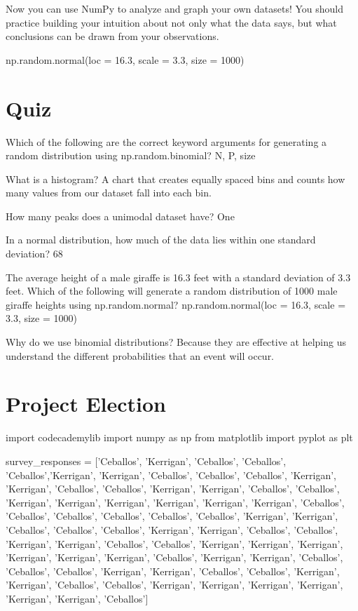 \documentclass{journal}
\begin{document}
Now you can use NumPy to analyze and graph your own datasets! You should practice building your intuition about not only what the data says, but what conclusions can be drawn from your observations.

np.random.normal(loc = 16.3, scale = 3.3, size = 1000)


\section{Quiz}
Which of the following are the correct keyword arguments for generating a random distribution using np.random.binomial?
N, P, size

What is a histogram?
A chart that creates equally spaced bins and counts how many values from our dataset fall into each bin.

How many peaks does a unimodal dataset have?
One

In a normal distribution, how much of the data lies within one standard deviation?
68%


The average height of a male giraffe is 16.3 feet with a standard deviation of 3.3 feet. Which of the following will generate a random distribution of 1000 male giraffe heights using np.random.normal?
np.random.normal(loc = 16.3, scale = 3.3, size = 1000)


Why do we use binomial distributions?
Because they are effective at helping us understand the different probabilities that an event will occur.


\section{Project Election}
import codecademylib
import numpy as np
from matplotlib import pyplot as plt

survey_responses = ['Ceballos', 'Kerrigan', 'Ceballos', 'Ceballos', 'Ceballos','Kerrigan', 'Kerrigan', 'Ceballos', 'Ceballos', 'Ceballos', 
'Kerrigan', 'Kerrigan', 'Ceballos', 'Ceballos', 'Kerrigan', 'Kerrigan', 'Ceballos', 'Ceballos', 'Kerrigan', 'Kerrigan', 'Kerrigan', 'Kerrigan', 'Kerrigan', 'Kerrigan', 'Ceballos', 'Ceballos', 'Ceballos', 'Ceballos', 'Ceballos', 'Ceballos',
'Kerrigan', 'Kerrigan', 'Ceballos', 'Ceballos', 'Ceballos', 'Kerrigan', 'Kerrigan', 'Ceballos', 'Ceballos', 'Kerrigan', 'Kerrigan', 'Ceballos', 'Ceballos', 'Kerrigan', 'Kerrigan', 'Kerrigan', 'Kerrigan', 'Kerrigan', 'Kerrigan', 'Ceballos',
'Kerrigan', 'Kerrigan', 'Ceballos', 'Ceballos', 'Ceballos', 'Kerrigan', 'Kerrigan', 'Ceballos', 'Ceballos', 'Kerrigan', 'Kerrigan', 'Ceballos', 'Ceballos', 'Kerrigan', 'Kerrigan', 'Kerrigan', 'Kerrigan', 'Kerrigan', 'Kerrigan', 'Ceballos']
\end{document}
